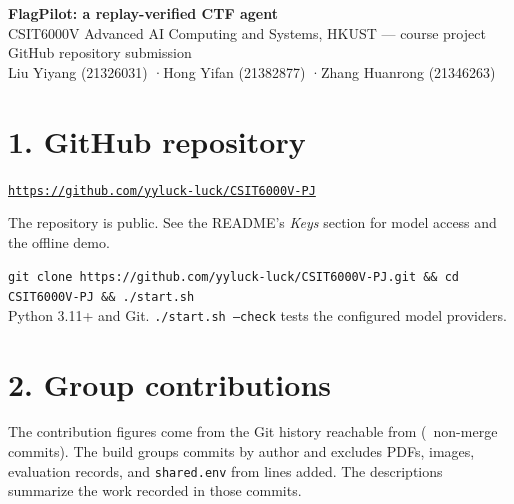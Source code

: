
\begin{center}
{\LARGE\bfseries FlagPilot: a replay-verified CTF agent}\\[6pt]
{\large CSIT6000V Advanced AI Computing and Systems, HKUST --- course project}\\[2pt]
{\large GitHub repository submission}\\[10pt]
Liu Yiyang (21326031) \quad·\quad Hong Yifan (21382877) \quad·\quad Zhang Huanrong (21346263)\\[4pt]
{\small\SubmitDate}
\end{center}
\vspace{6pt}

\section*{1. GitHub repository}
\begin{description}[leftmargin=2.6cm]
\item[Repository] \href{https://github.com/yyluck-luck/CSIT6000V-PJ}{\texttt{https://github.com/yyluck-luck/CSIT6000V-PJ}}
\item[Snapshot] \href{https://github.com/yyluck-luck/CSIT6000V-PJ/commit/\SubmitCommitFull}{\texttt{\SubmitCommit}}
\item[Access] The repository is public. See the README's \emph{Keys} section for model access and the offline demo.
\item[Start] \texttt{git clone https://github.com/yyluck-luck/CSIT6000V-PJ.git \&\& cd CSIT6000V-PJ \&\& ./start.sh}\\
Python 3.11+ and Git. \texttt{./start.sh --check} tests the configured model providers.
\end{description}

\section*{2. Group contributions}
The contribution figures come from the Git history reachable from \texttt{\SubmitCommit} (\TotalCommits\ non-merge commits). The build groups commits by author and excludes PDFs, images, evaluation records, and \texttt{shared.env} from lines added. The descriptions summarize the work recorded in those commits.

